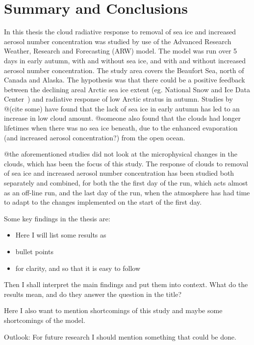 \chapter{Summary and Conclusions}
\label{chap:summaryconclusions}
In this thesis the cloud radiative response to removal of sea ice and increased aerosol number concentration was studied by use of the Advanced Research Weather, Research and Forecasting (ARW) model. The model was run over 5 days in early autumn, with and without sea ice, and with and without increased aerosol number concentration. The study area covers the Beaufort Sea, north of Canada and Alaska. The hypothesis was that there could be a positive feedback between the declining areal Arctic sea ice extent (eg. National Snow and Ice Data Center~\citep{NSIDC}) and radiative response of low Arctic stratus in autumn. Studies by @(cite some) have found that the lack of sea ice in early autumn has led to an increase in low cloud amount. @someone also found that the clouds had longer lifetimes when there was no sea ice beneath, due to the enhanced evaporation (and increased aerosol concentration?) from the open ocean. 

@the aforementioned studies did not look at the microphysical changes in the clouds, which has been the focus of this study. The response of clouds to removal of sea ice and increased aerosol number concentration has been studied both separately and combined, for both the the first day of the run, which acts almost as an off-line run, and the last day of the run, when the atmosphere has had time to adapt to the changes implemented on the start of the first day.

Some key findings in the thesis are:
\begin{itemize}
\item Here I will list some results as 
\item bullet points
\item for clarity, and so that it is easy to follow
\end{itemize}

Then I shall interpret the main findings and put them into context. What do the results mean, and do they answer the question in the title? 

Here I also want to mention shortcomings of this study and maybe some shortcomings of the model.


Outlook: For future research I should mention something that could be done.



